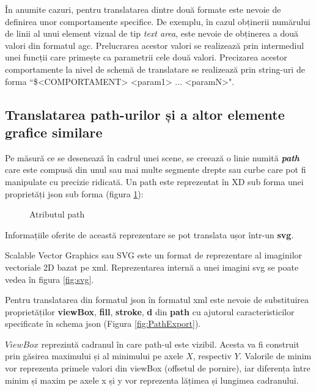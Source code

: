  În anumite cazuri, pentru translatarea dintre două formate este nevoie de definirea unor comportamente specifice. De exemplu, în cazul obținerii numărului de linii al unui element vizual de tip \textit{text area}, este nevoie de obținerea a două valori din formatul agc. Prelucrarea acestor valori se realizează prin intermediul unei funcții care primește ca parametrii cele două valori. 
 Precizarea acestor comportamente la nivel de schemă de translatare se realizează prin string-uri de forma ``\$<COMPORTAMENT> <param1> ... <paramN>".

\subsection{Translatarea path-urilor și a altor elemente grafice similare}

Pe măsură ce se desenează în cadrul unei scene, se creează o linie numită \textbf{\textit{path}} care este compusă din unul sau mai multe segmente drepte sau curbe care pot fi manipulate cu precizie ridicată. Un path este reprezentat în XD sub forma unei proprietăți json sub forma (figura \ref{fig:path}):

\begin{figure}[!htbp]
\caption{Atributul path}\label{fig:path}
\end{figure}

Informațiile oferite de această reprezentare se pot translata ușor într-un \textbf{svg}. 

Scalable Vector Graphics sau SVG este un format de reprezentare al imaginilor vectoriale 2D bazat pe xml. Reprezentarea internă a unei imagini svg se poate vedea în figura \ref{fig:svg}.

Pentru translatarea din formatul json în formatul xml este nevoie de substituirea proprietăților \textbf{viewBox}, \textbf{fill}, \textbf{stroke}, \textbf{d} din \textbf{path} cu ajutorul caracteristicilor specificate în schema json (Figura \ref{fig:PathExport}).


$ViewBox$ reprezintă cadranul în care path-ul este vizibil. Acesta va fi construit prin găsirea maximului și al minimului pe axele $X$, respectiv $Y$. Valorile de minim vor reprezenta primele valori din viewBox (offsetul de pornire), iar diferența între minim și maxim pe axele x și y vor reprezenta lățimea și lungimea cadranului.

